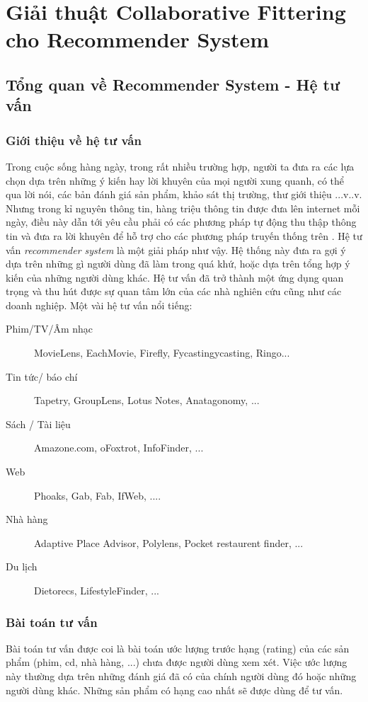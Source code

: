 \documentclass{report}
\begin{document}
\chapter{Giải thuật Collaborative Fittering cho Recommender System}

\section{Tổng quan về Recommender System - Hệ tư vấn}
\subsection{Giới thiệu về hệ tư vấn}
Trong cuộc sống hàng ngày, trong rất nhiều trường hợp, người ta đưa ra các lựa chọn
dựa trên những ý kiến hay lời khuyên của mọi người xung quanh, có thể qua lời nói,
các bản đánh giá sản phẩm, khảo sát thị trường, thư giới thiệu ...v..v. Nhưng trong kỉ
nguyên thông tin, hàng triệu thông tin được đưa lên internet mỗi ngày, điều này dẫn
tới yêu cầu phải có các phương pháp tự động thu thập thông tin và đưa ra lời khuyên
để hỗ trợ cho các phương pháp truyến thống trên . Hệ tư vấn \emph{recommender system} là một giải pháp như vậy. Hệ thống này đưa ra gợi ý dựa trên những gì người dùng đã
làm trong quá khứ, hoặc dựa trên tổng hợp ý kiến của những người dùng khác. Hệ tư
vấn đã trở thành một ứng dụng quan trọng và thu hút được sự quan tâm lớn của các
nhà nghiên cứu cũng như các doanh nghiệp.
Một vài hệ tư vấn nổi tiếng:
\begin{description}
	\item[Phim/TV/Âm nhạc] MovieLens, EachMovie, Firefly, Fycastingycasting, Ringo...
	\item[Tin tức/ báo chí] Tapetry, GroupLens, Lotus Notes, Anatagonomy, ...
	\item [Sách / Tài liệu] Amazone.com, oFoxtrot, InfoFinder, ...
	\item [Web] Phoaks, Gab, Fab, IfWeb, ....
	\item [Nhà hàng] Adaptive Place Advisor, Polylens, Pocket restaurent finder, ...
	\item [Du lịch] Dietorecs, LifestyleFinder, ...
	\end{description}

\subsection{Bài toán tư vấn}
Bài toán tư vấn được coi là bài toán ước lượng trước hạng (rating) của các sản phẩm (phim, cd, nhà hàng, ...) chưa được người dùng xem xét. Việc ước lượng này thường dựa trên những đánh giá đã có của chính người dùng đó hoặc những người dùng khác. Những sản phẩm có hạng cao nhất sẽ được dùng để tư vấn.
\end{document}
